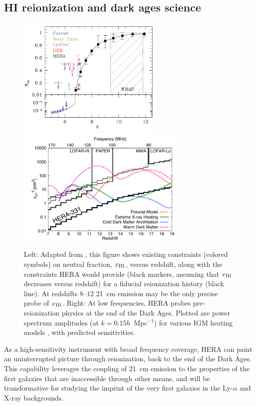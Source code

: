 \documentclass[preprint]{aastex}
\def\HI{{H{\small I }}}
\def\xHI{{x_{\rm\HI}}}
\begin{document}


\subsection{HI reionization and dark ages science} %

\begin{figure}[t]\centering
\includegraphics[height=2.25in]{plots/constraints.pdf}
\includegraphics[height=2.25in]{plots/Xray/HERA_II_compare_kp1_whoriz_20pt.pdf} 
\caption{\small 
Left: 
Adapted from \citet{robertson_2013}, this figure shows existing
constraints (colored symbols) on neutral fraction, $\xHI$, versus redshift, along with 
the constraints HERA would provide (black markers, assuming
that $\xHI$ decreases versus redshift) for a fiducial
reionization history (black line).
At redshifts 8--12
21~cm emission may be the only precise probe of $\xHI$.
Right: At low frequencies, HERA probes
pre-reionization physics at the end of the Dark Ages. Plotted are power spectrum amplitudes (at $k =
0.15h$~Mpc$^{-1}$) for various IGM heating models \citep{mesinger_et_al2013},
with predicted sensitivities.
}\label{fig:x_i_vs_z} \end{figure}

As a high-sensitivity instrument with broad frequency coverage, HERA can
paint an uninterrupted picture through reionization, back to the end of 
the Dark Ages. This capability leverages the coupling of
21~cm emission to the properties of the first galaxies that
are inaccessible through other means,  and will be transformative for
studying the imprint of the very first galaxies in the Ly-$\alpha$ and X-ray backgrounds.  
\end{document}
